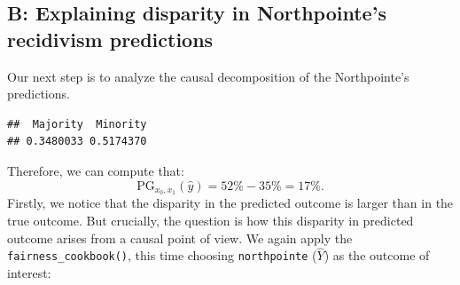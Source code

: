\documentclass{article}
\newenvironment{Shaded}{\begin{snugshade}}{\end{snugshade}}
\newcommand{\AttributeTok}[1]{\textcolor[rgb]{0.77,0.63,0.00}{#1}}
\newcommand{\ConstantTok}[1]{\textcolor[rgb]{0.00,0.00,0.00}{#1}}
\newcommand{\FunctionTok}[1]{\textcolor[rgb]{0.00,0.00,0.00}{#1}}
\newcommand{\NormalTok}[1]{#1}
\newcommand{\OtherTok}[1]{\textcolor[rgb]{0.56,0.35,0.01}{#1}}
\newcommand{\SpecialCharTok}[1]{\textcolor[rgb]{0.00,0.00,0.00}{#1}}
\newcommand{\StringTok}[1]{\textcolor[rgb]{0.31,0.60,0.02}{#1}}
\begin{document}
\hypertarget{b-explaining-disparity-in-northpointes-recidivism-predictions}{%
\subsection{B: Explaining disparity in Northpointe's recidivism
predictions}\label{b-explaining-disparity-in-northpointes-recidivism-predictions}}

Our next step is to analyze the causal decomposition of the
Northpointe's predictions.

\begin{Shaded}
\end{Shaded}

\begin{verbatim}
##  Majority  Minority 
## 0.3480033 0.5174370
\end{verbatim}

Therefore, we can compute that: \begin{equation}
  \text{PG}_{x_0, x_1}(\hat{y}) = 52\% - 35\% = 17\%.
\end{equation} Firstly, we notice that the disparity in the predicted
outcome is larger than in the true outcome. But crucially, the question
is how this disparity in predicted outcome arises from a causal point of
view. We again apply the \texttt{fairness\_cookbook()}, this time
choosing \texttt{northpointe} (\(\hat{Y}\)) as the outcome of interest:

\begin{Shaded}
\end{Shaded}
\end{document}
